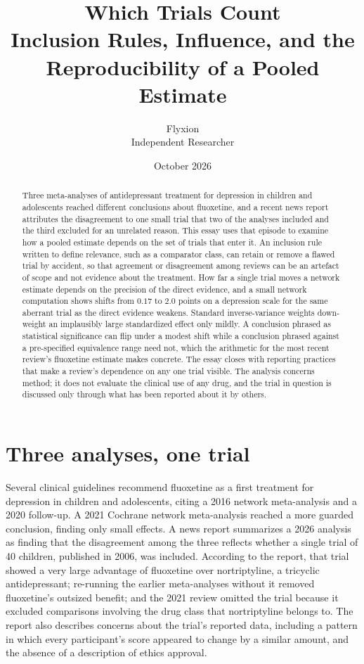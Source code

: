 \documentclass[11pt]{article}
\title{Which Trials Count\\[4pt]
\large Inclusion Rules, Influence, and the Reproducibility of a Pooled Estimate}
\author{Flyxion\\Independent Researcher}
\date{October 2026}
\theoremstyle{definition}
\begin{document}
\maketitle

\begin{abstract}
\noindent
Three meta-analyses of antidepressant treatment for depression in children and adolescents reached different conclusions about fluoxetine, and a recent news report attributes the disagreement to one small trial that two of the analyses included and the third excluded for an unrelated reason. This essay uses that episode to examine how a pooled estimate depends on the set of trials that enter it. An inclusion rule written to define relevance, such as a comparator class, can retain or remove a flawed trial by accident, so that agreement or disagreement among reviews can be an artefact of scope and not evidence about the treatment. How far a single trial moves a network estimate depends on the precision of the direct evidence, and a small network computation shows shifts from $0.17$ to $2.0$ points on a depression scale for the same aberrant trial as the direct evidence weakens. Standard inverse-variance weights down-weight an implausibly large standardized effect only mildly. A conclusion phrased as statistical significance can flip under a modest shift while a conclusion phrased against a pre-specified equivalence range need not, which the arithmetic for the most recent review's fluoxetine estimate makes concrete. The essay closes with reporting practices that make a review's dependence on any one trial visible. The analysis concerns method; it does not evaluate the clinical use of any drug, and the trial in question is discussed only through what has been reported about it by others.
\end{abstract}

\section{Three analyses, one trial}

Several clinical guidelines recommend fluoxetine as a first treatment for depression in children and adolescents, citing a 2016 network meta-analysis and a 2020 follow-up. A 2021 Cochrane network meta-analysis \citep{hetrick2021} reached a more guarded conclusion, finding only small effects. A news report \citep{vannoorden2026} summarizes a 2026 analysis \citep{lyus2026} as finding that the disagreement among the three reflects whether a single trial of 40 children, published in 2006, was included. According to the report, that trial showed a very large advantage of fluoxetine over nortriptyline, a tricyclic antidepressant; re-running the earlier meta-analyses without it removed fluoxetine's outsized benefit; and the 2021 review omitted the trial because it excluded comparisons involving the drug class that nortriptyline belongs to. The report also describes concerns about the trial's reported data, including a pattern in which every participant's score appeared to change by a similar amount, and the absence of a description of ethics approval.
\end{document}

